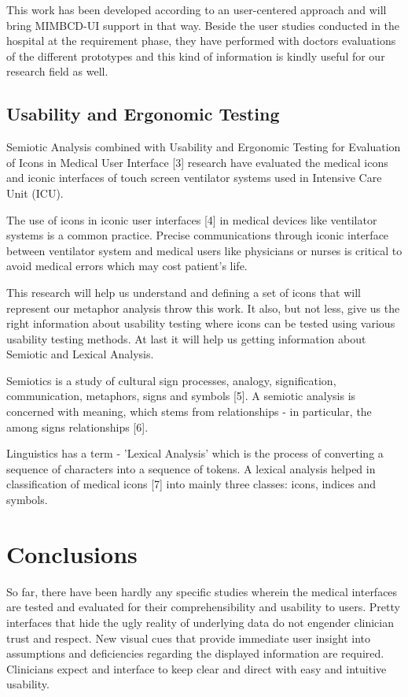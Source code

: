 This work has been developed according to an user-centered approach and will bring MIMBCD-UI support in that way. Beside the user studies conducted in the hospital at the requirement phase, they have performed with doctors evaluations of the different prototypes and this kind of information is kindly useful for our research field as well.

\subsection{Usability and Ergonomic Testing}

Semiotic Analysis combined with Usability and Ergonomic Testing for Evaluation of Icons in Medical User Interface [3] research have evaluated the medical icons and iconic interfaces of touch screen ventilator systems used in Intensive Care Unit (ICU).

The use of icons in iconic user interfaces [4] in medical devices like ventilator systems is a common practice. Precise communications through iconic interface between ventilator system and medical users like physicians or nurses is critical to avoid medical errors which may cost patient's life.

This research will help us understand and defining a set of icons that will represent our metaphor analysis throw this work. It also, but not less, give us the right information about usability testing where icons can be tested using various usability testing methods. At last it will help us getting information about Semiotic and Lexical Analysis.

Semiotics is a study of cultural sign processes, analogy, signification, communication, metaphors, signs and symbols [5]. A semiotic analysis is concerned with meaning, which stems from relationships - in particular, the among signs relationships [6].

Linguistics has a term - 'Lexical Analysis' which is the process of converting a sequence of characters into a sequence of tokens. A lexical analysis helped in classification of medical icons [7] into mainly three classes: icons, indices and symbols.

\clearpage

\section{Conclusions}

So far, there have been hardly any specific studies wherein the medical interfaces are tested and evaluated for their comprehensibility and usability to users. Pretty interfaces that hide the ugly reality of underlying data do not engender clinician trust and respect. New visual cues that provide immediate user insight into assumptions and deficiencies regarding the displayed information are required. Clinicians expect and interface to keep clear and direct with easy and intuitive usability.

